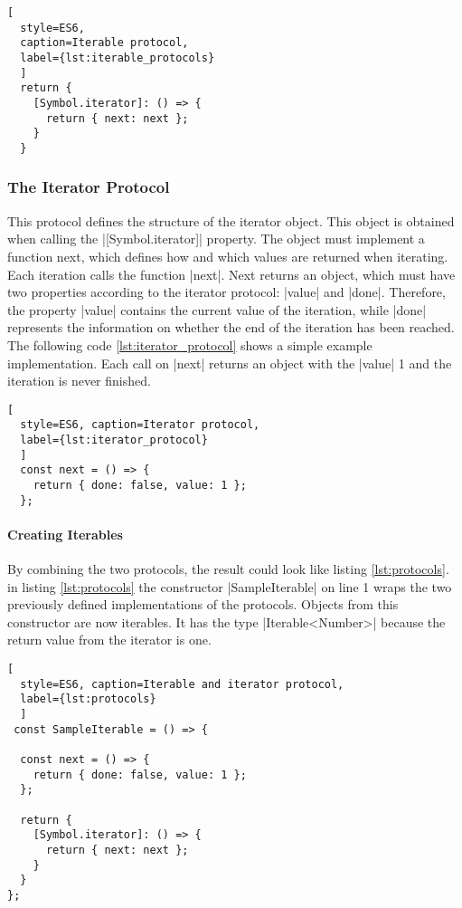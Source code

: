 \begin{lstlisting}[
  style=ES6, 
  caption=Iterable protocol,
  label={lst:iterable_protocols}
  ]
  return {
    [Symbol.iterator]: () => {
      return { next: next };
    }
  }
\end{lstlisting}

\subsubsection{The Iterator Protocol}
This protocol defines the structure of the iterator object. This object is
obtained when calling the |[Symbol.iterator]| property. The object must implement a
function next, which defines how and which values are returned when iterating.
Each iteration calls the function |next|. Next returns an object, which must
have two properties according to the iterator protocol: |value| and |done|.
Therefore, the property |value| contains the current value of the iteration,
while |done| represents the information on whether the end of the iteration has
been reached. The following code \ref{lst:iterator_protocol} shows a simple example implementation. 
Each call on |next| returns an object with the |value| 1 and the iteration is
never finished. 

\begin{lstlisting}[
  style=ES6, caption=Iterator protocol,
  label={lst:iterator_protocol}
  ]
  const next = () => {
    return { done: false, value: 1 };
  };
\end{lstlisting}

\paragraph{Creating Iterables}
By combining the two protocols, the result could look like listing
\ref{lst:protocols}. in listing \ref{lst:protocols} the constructor 
|SampleIterable| on line 1 wraps the two previously
defined implementations of the protocols. Objects from this constructor are now
iterables. It has the type |Iterable<Number>| because the return value from the
iterator is one.

\begin{lstlisting}[
  style=ES6, caption=Iterable and iterator protocol,
  label={lst:protocols}
  ]
 const SampleIterable = () => {

  const next = () => {
    return { done: false, value: 1 };
  };

  return {
    [Symbol.iterator]: () => {
      return { next: next };
    }
  }
};
\end{lstlisting}

